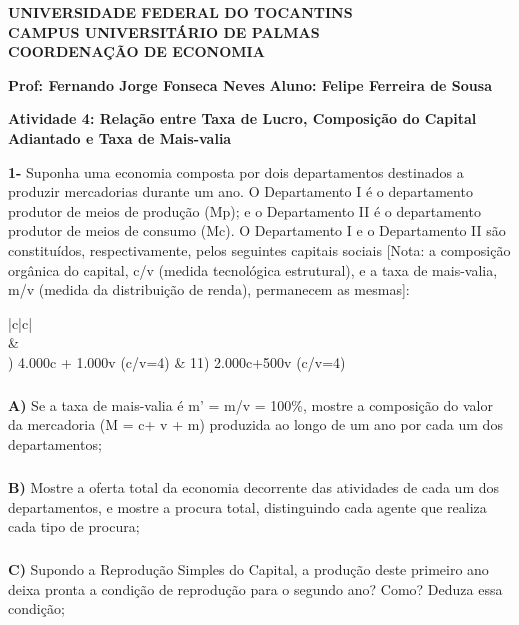 \documentclass[a4paper, 12pt]{article} %
\begin{document}
\begin{center}
\textbf{UNIVERSIDADE FEDERAL DO TOCANTINS\\
	CAMPUS UNIVERSITÁRIO DE PALMAS\\
	COORDENAÇÃO DE ECONOMIA}
\end{center}

\textbf{Prof: Fernando Jorge Fonseca Neves }
\singlespacing
\textbf{Aluno: Felipe Ferreira de Sousa}
\begin{center}
\textbf{Atividade 4: Relação entre Taxa de Lucro, Composição do Capital Adiantado e Taxa de Mais-valia}
\end{center}
\vspace{0.5cm}


\par \textbf{1-} Suponha uma economia composta por dois departamentos destinados a produzir mercadorias
durante um ano. O Departamento I é o departamento produtor de meios de produção (Mp); e o
Departamento II é o departamento produtor de meios de consumo (Mc). O Departamento I e o
Departamento II são constituídos, respectivamente, pelos seguintes capitais sociais [Nota: a composição
orgânica do capital, c/v (medida tecnológica estrutural), e a taxa de mais-valia, m/v (medida da
distribuição de renda), permanecem as mesmas]:

\vspace{0.5cm}
\begin{center}
\begin{tabular}{|c|c|}
	\hline {} {} \\
	\hline {} &  \\
	) 4.000c + 1.000v  (c/v=4) & 11) 2.000c+500v (c/v=4) \\
	\hline
\end{tabular}
\end{center}

\subparagraph{} \textbf{A)} Se a taxa de mais-valia é m’ = m/v = 100\%, mostre a composição do valor da mercadoria (M = c+ v + m) produzida ao longo de um ano por cada um dos departamentos; 

\subparagraph{} \textbf{B)} Mostre a oferta total da economia decorrente das atividades de cada um dos departamentos, e
mostre a procura total, distinguindo cada agente que realiza cada tipo de procura;

\subparagraph{} \textbf{C)} Supondo a Reprodução Simples do Capital, a produção deste primeiro ano deixa pronta a
condição de reprodução para o segundo ano? Como? Deduza essa condição;
\end{document}
